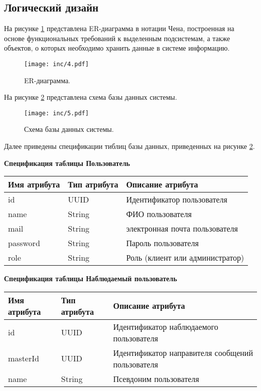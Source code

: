 \subsection{Логический дизайн}
На рисунке \ref{img:er} представлена ER-диаграмма в нотации Чена, построенная на основе функциональных требований к выделенным подсистемам, а также объектов, о которых необходимо хранить данные в системе информацию.

\begin{figure}[H]
	\centering
	\texttt{[image: inc/4.pdf]}
	\caption{ ER-диаграмма.}
	\label{img:er}
\end{figure}

На рисунке \ref{img:bd} представлена схема базы данных системы.

\begin{figure}[H]
	\centering
	\texttt{[image: inc/5.pdf]}
	\caption{ Схема базы данных системы.}
	\label{img:bd}
\end{figure}

Далее приведены спецификации тиблиц базы данных, приведенных на рисунке \ref{img:bd}.

\textbf{Спецификация таблицы Пользователь}

\begin{table}[H]
\begin{center}
\begin{tabular}{|C{4cm}|C{4cm}|C{6cm}|}
\hline
\textbf{Имя атрибута} & \textbf{Тип атрибута} & \textbf{Описание атрибута} \\ \hline
id & UUID & Идентификатор пользователя \\ \hline
name & String & ФИО пользователя \\ \hline
mail & String & электронная почта пользователя \\ \hline
password & String & Пароль пользователя \\ \hline
role & String & Роль (клиент или администратор) \\ \hline
\end{tabular}
\end{center}
\end{table}

\pagebreak

\textbf{Спецификация таблицы Наблюдаемый пользователь}

\begin{table}[H]
\begin{center}
\begin{tabular}{|C{4cm}|C{4cm}|C{6cm}|}
\hline
\textbf{Имя атрибута} & \textbf{Тип атрибута} & \textbf{Описание атрибута} \\ \hline
id & UUID & Идентификатор наблюдаемого пользователя \\ \hline
masterId & UUID & Идентификатор направителя сообщений пользователя \\ \hline
name & String & Псевдоним пользователя \\ \hline
\end{tabular}
\end{center}
\end{table}

